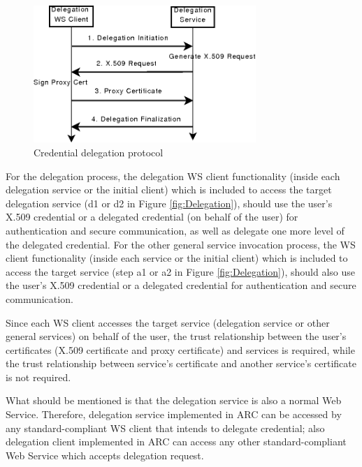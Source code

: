 \documentclass[twocolumn]{svjour3}         %
\begin{document}
\begin{figure}
\includegraphics[width=0.75\textwidth]{Delegation_protocol.png}
\caption{Credential delegation protocol}
\label{fig:Delegation_protocol}
\end{figure}
For the delegation process, the delegation WS client functionality (inside each delegation service or the initial client) which is included to access the target delegation service (d1 or d2 in Figure \ref{fig:Delegation}), should use the user’s X.509 credential or a delegated credential (on behalf of the user) for authentication and secure communication, as well as delegate one more level of the delegated credential. For the other general  service invocation process, the WS client functionality (inside each service or the initial client) which is included to access the target service (step a1 or a2 in Figure \ref{fig:Delegation}), should also use the user’s X.509 credential or a delegated credential for authentication and secure communication.

Since each WS client accesses the target service (delegation service or other general services) on behalf of the user, the trust relationship between the user’s certificates (X.509 certificate and proxy certificate) and services is required, while the trust relationship between service’s certificate and another service’s certificate is not required.

What should be mentioned is that the delegation service is also a normal Web Service. Therefore, delegation service implemented in ARC can be accessed by any standard-compliant WS client that intends to delegate credential; also delegation client implemented in ARC can access any other standard-compliant Web Service which accepts delegation request.
\end{document}
